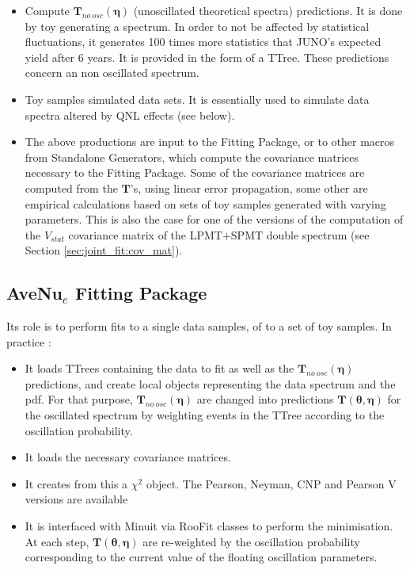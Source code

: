 \documentclass[../main.tex]{subfiles}
\begin{document}
\begin{itemize}
  \item Compute $\bm{T}_{no~osc}(\bm{\eta})$ (unoscillated theoretical spectra) predictions. It is done by toy generating a spectrum. In order to not be affected by statistical fluctuations, it generates 100 times more statistics that JUNO's expected yield after 6 years. It is provided in the form of a TTree. These predictions concern an non oscillated spectrum.

  \item Toy samples simulated data sets. It is essentially used to simulate data spectra altered by QNL effects (see below).

  \item The above productions are input to the Fitting Package, or to other macros from Standalone Generators, which compute the covariance matrices necessary to the Fitting Package. Some of the covariance matrices are computed from the $\bm{T}$'s, using linear error propagation, some other are empirical calculations based on sets of toy samples generated with varying parameters. This is also the case for one of the versions of the computation of the $V_{stat}$ covariance matrix of the LPMT+SPMT double spectrum (see Section \ref{sec:joint_fit:cov_mat}).
\end{itemize}



\subsection{AveNu$_e$ Fitting Package}
\label{sec:joint_fit:avenue_fit}

Its role is to perform fits to a single data samples, of to a set of toy samples. In practice :

\begin{itemize}
  \item It loads TTrees containing the data to fit as well as the $\bm{T}_{no~osc}(\bm{\eta})$ predictions, and create local objects representing the data spectrum and the pdf. For that purpose, $\bm{T}_{no~osc}(\bm{\eta})$ are changed into predictions $\bm{T}(\bm{\theta},\bm{\eta})$ for the oscillated spectrum by weighting events in the TTree according to the oscillation probability.
  \item It loads the necessary covariance matrices.
  \item It creates from this a $\chi^2$ object. The Pearson, Neyman, CNP and Pearson V versions are available

  \item It is interfaced with Minuit via RooFit classes to perform the minimisation. At each step, $\bm{T}(\bm{\theta},\bm{\eta})$ are re-weighted by the oscillation probability corresponding to the current value of the floating oscillation parameters.
\end{itemize}
\hfill
\end{document}
